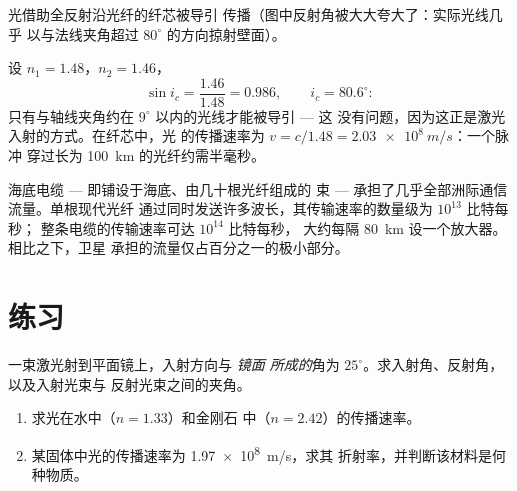 \begin{omfigure}

{\small 光借助全反射沿光纤的纤芯被导引
传播（图中反射角被大大夸大了：实际光线几乎
以与法线夹角超过 $80^\circ$ 的方向掠射壁面）。}
\end{omfigure}

\begin{example}[用数据看光纤]\label{ex:g10:refraction:fibernumbers}
设 $n_1 = 1.48$，$n_2 = 1.46$，
\[
\sin i_c = \frac{1.46}{1.48} = 0.986,
\qquad i_c = 80.6^\circ :
\]
只有与轴线夹角约在 $9^\circ$ 以内的光线才能被导引 --- 这
没有问题，因为这正是激光入射的方式。在纤芯中，光
的传播速率为 $v = c/1.48 = \qty{2.03e8}{m/s}$：一个脉冲
穿过长为 \qty{100}{km} 的光纤约需半毫秒。
\end{example}

\begin{remark}[数据传输的数量级]\label{rem:g10:refraction:datarates}
海底电缆 --- 即铺设于海底、由几十根光纤组成的
束 --- 承担了几乎全部洲际通信流量。单根现代光纤
通过同时发送许多波长，其传输速率的数量级为 $10^{13}$ 比特每秒；
整条电缆的传输速率可达 $10^{14}$ 比特每秒，
大约每隔 \qty{80}{km} 设一个放大器。相比之下，卫星
承担的流量仅占百分之一的极小部分。
\end{remark}

\section{练习}

\begin{exercise}[$\star$]\label{exo:g10:refraction:1}
一束激光射到平面镜上，入射方向与 \emph{镜面
所成的}角为 $25^\circ$。求入射角、反射角，以及入射光束与
反射光束之间的夹角。
\end{exercise}

\begin{exercise}[$\star$]\label{exo:g10:refraction:2}
\begin{enumerate}
  \item 求光在水中（$n = 1.33$）和金刚石
        中（$n = 2.42$）的传播速率。
  \item 某固体中光的传播速率为 \qty{1.97e8}{m/s}，求其
        折射率，并判断该材料是何种物质。
\end{enumerate}
\end{exercise}

